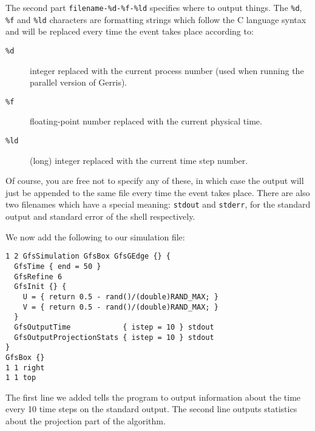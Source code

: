 \documentclass[a4paper]{article}
\begin{document}
The second part {\tt filename-\%d-\%f-\%ld} specifies where to output
things. The {\tt \%d}, {\tt \%f} and {\tt \%ld} characters are
formatting strings which follow the C language syntax and will be
replaced every time the event takes place according to:
\begin{description}
\item[{\tt \%d}] integer replaced with the current process number (used when
running the parallel version of Gerris).
\item[{\tt \%f}] floating-point number replaced with the current
physical time.
\item[{\tt \%ld}] (long) integer replaced with the current time step number.
\end{description}
Of course, you are free not to specify any of these, in which case the 
output will just be appended to the same file every time the event
takes place. There are also two filenames which have a special
meaning: {\tt stdout} and {\tt stderr}, for the standard output and
standard error of the shell respectively.

We now add the following to our simulation file:
\begin{verbatim}
1 2 GfsSimulation GfsBox GfsGEdge {} {
  GfsTime { end = 50 }
  GfsRefine 6
  GfsInit {} {
    U = { return 0.5 - rand()/(double)RAND_MAX; }
    V = { return 0.5 - rand()/(double)RAND_MAX; }
  }  
  GfsOutputTime            { istep = 10 } stdout
  GfsOutputProjectionStats { istep = 10 } stdout
}
GfsBox {}
1 1 right
1 1 top
\end{verbatim}
The first line we added tells the program to output information about
the time every 10 time steps on the standard output. The second line
outputs statistics about the projection part of the algorithm.
\end{document}

